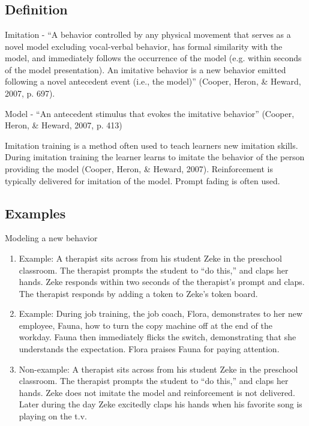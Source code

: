 \section{\fourdFour{}}
\subsection{Definition}
Imitation - ``A behavior controlled by any physical movement that serves as a novel model excluding vocal-verbal behavior, has formal similarity with the model, and immediately follows the occurrence of the model (e.g. within seconds of the model presentation).  An imitative behavior is a new behavior emitted following a novel antecedent event (i.e., the model)'' (Cooper, Heron, \& Heward, 2007, p. 697).

Model - ``An antecedent stimulus that evokes the imitative behavior'' (Cooper, Heron, \& Heward, 2007, p. 413)

Imitation training is a method often used to teach learners new imitation skills.  During imitation training the learner learns to imitate the behavior of the person providing the model (Cooper, Heron, \& Heward, 2007). Reinforcement is typically delivered for imitation of the model. Prompt fading is often used.  

\subsection{Examples} Modeling a new behavior
\begin{enumerate}
\item Example: A therapist sits across from his student Zeke in the preschool classroom.  The therapist prompts the student to ``do this,'' and claps her hands.  Zeke responds within two seconds of the therapist's prompt and claps.  The therapist responds by adding a token to Zeke's token board.
\item Example:  During job training, the job coach, Flora, demonstrates to her new employee, Fauna, how to turn the copy machine off at the end of the workday.  Fauna then immediately flicks the switch, demonstrating that she understands the expectation.  Flora praises Fauna for paying attention.  
\item Non-example: A therapist sits across from his student Zeke in the preschool classroom.  The therapist prompts the student to ``do this,'' and claps her hands.  Zeke does not imitate the model and reinforcement is not delivered.  Later during the day Zeke excitedly claps his hands when his favorite song is playing on the t.v.
\end{enumerate}
%
